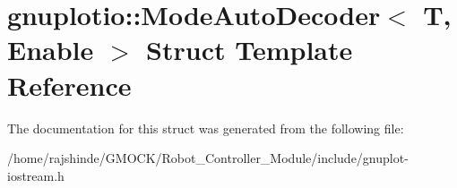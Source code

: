 \hypertarget{structgnuplotio_1_1_mode_auto_decoder}{}\section{gnuplotio\+:\+:Mode\+Auto\+Decoder$<$ T, Enable $>$ Struct Template Reference}
\label{structgnuplotio_1_1_mode_auto_decoder}


The documentation for this struct was generated from the following file\+:\begin{DoxyCompactItemize}
\item 
/home/rajshinde/\+G\+M\+O\+C\+K/\+Robot\+\_\+\+Controller\+\_\+\+Module/include/gnuplot-\/iostream.\+h\end{DoxyCompactItemize}
